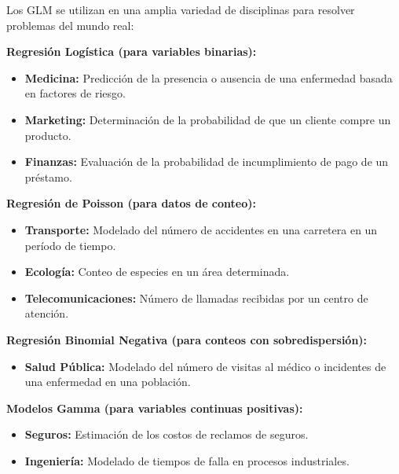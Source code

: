 \documentclass[
  letterpaper,
  DIV=11,
  numbers=noendperiod]{scrreprt}
\providecommand{\tightlist}{%
  \setlength{\itemsep}{0pt}\setlength{\parskip}{0pt}}
\begin{document}
\begin{tcolorbox}[enhanced jigsaw, leftrule=.75mm, breakable, colbacktitle=quarto-callout-note-color!10!white, bottomrule=.15mm, colframe=quarto-callout-note-color-frame, toprule=.15mm, colback=white, coltitle=black, bottomtitle=1mm, left=2mm, title=\textcolor{quarto-callout-note-color}{\faInfo}\hspace{0.5em}{Aplicaciones}, opacityback=0, arc=.35mm, opacitybacktitle=0.6, toptitle=1mm, titlerule=0mm, rightrule=.15mm]

Los GLM se utilizan en una amplia variedad de disciplinas para resolver
problemas del mundo real:

\textbf{Regresión Logística (para variables binarias):}

\begin{itemize}
\tightlist
\item
  \textbf{Medicina:} Predicción de la presencia o ausencia de una
  enfermedad basada en factores de riesgo.
\item
  \textbf{Marketing:} Determinación de la probabilidad de que un cliente
  compre un producto.
\item
  \textbf{Finanzas:} Evaluación de la probabilidad de incumplimiento de
  pago de un préstamo.
\end{itemize}

\textbf{Regresión de Poisson (para datos de conteo):}

\begin{itemize}
\tightlist
\item
  \textbf{Transporte:} Modelado del número de accidentes en una
  carretera en un período de tiempo.
\item
  \textbf{Ecología:} Conteo de especies en un área determinada.
\item
  \textbf{Telecomunicaciones:} Número de llamadas recibidas por un
  centro de atención.
\end{itemize}

\textbf{Regresión Binomial Negativa (para conteos con sobredispersión):}

\begin{itemize}
\tightlist
\item
  \textbf{Salud Pública:} Modelado del número de visitas al médico o
  incidentes de una enfermedad en una población.
\end{itemize}

\textbf{Modelos Gamma (para variables continuas positivas):}

\begin{itemize}
\tightlist
\item
  \textbf{Seguros:} Estimación de los costos de reclamos de seguros.
\item
  \textbf{Ingeniería:} Modelado de tiempos de falla en procesos
  industriales.
\end{itemize}

\end{tcolorbox}
\end{document}
